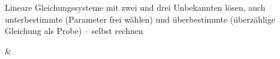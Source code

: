 \begin{aufgabe}{Lineare Gleichungssysteme mit zwei und drei Unbekannten lösen, auch unterbestimmte (Parameter frei wählen) und überbestimmte (überzählige Gleichung als Probe) – selbst rechnen}
\begin{gleichungsraster}[2]
 & \\
\end{gleichungsraster}
\end{aufgabe}
